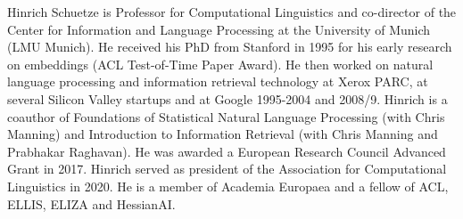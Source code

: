 Hinrich Schuetze is Professor for Computational Linguistics
and co-director of the Center for Information and Language
Processing at the University of Munich (LMU Munich).  He
received his PhD from Stanford in 1995 for his early
research on embeddings (ACL Test-of-Time Paper Award). He
then worked on natural language processing and information
retrieval technology at Xerox PARC, at several Silicon
Valley startups and at Google 1995-2004 and 2008/9.  Hinrich
is a coauthor of Foundations of Statistical Natural Language
Processing (with Chris Manning) and Introduction to
Information Retrieval (with Chris Manning and Prabhakar
Raghavan).  He was awarded a European Research Council
Advanced Grant in 2017.  Hinrich served as president of the
Association for Computational Linguistics in 2020. He is a
member of Academia Europaea and a fellow of ACL, ELLIS,
ELIZA and HessianAI.